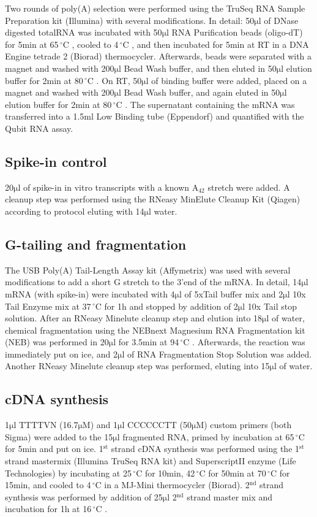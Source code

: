 \documentclass[10pt]{article}
\newcommand{\mul}{\ensuremath{\mathrm{\mu l}} }
\newcommand{\C}{\,$^{\circ}\mathrm{C}$ }
\begin{document}
Two rounds of poly(A) selection were performed using the TruSeq RNA Sample Preparation kit (Illumina) with several modifications. In detail: 50\mul of DNase digested totalRNA was incubated with 50\mul RNA Purification beads (oligo-dT) for 5min at 65\C, cooled to 4\C, and then incubated for 5min at RT in a DNA Engine tetrade 2 (Biorad) thermocycler. Afterwards, beads were separated with a magnet and washed with 200\mul Bead Wash buffer, and then eluted in 50\mul elution buffer for 2min at 80\C. On RT, 50\mul of binding buffer were added, placed on a magnet and washed with 200\mul Bead Wash buffer, and again eluted in 50\mul elution buffer for 2min at 80\C. The supernatant containing the mRNA was transferred into a 1.5ml Low Binding tube (Eppendorf) and quantified with the Qubit RNA assay.

\subsection*{Spike-in control}

20\mul of spike-in in vitro transcripts with a known A$_{42}$ stretch \cite{pelechano13} were added. A cleanup step was performed using the RNeasy MinElute Cleanup Kit (Qiagen) according to protocol eluting with 14\mul water.

\subsection*{G-tailing and fragmentation}

The USB Poly(A) Tail-Length Assay kit (Affymetrix) was used with several modifications to add a short G stretch to the 3’end of the mRNA. In detail, 14\mul mRNA (with spike-in) were incubated with 4\mul of 5xTail buffer mix and 2\mul 10x Tail Enzyme mix at 37\C for 1h and stopped by addition of 2\mul 10x Tail stop solution. After an RNeasy Minelute cleanup step and elution into 18\mul of water, chemical fragmentation using the NEBnext Magnesium RNA Fragmentation kit (NEB) was performed in 20\mul for 3.5min at 94\C. Afterwards, the reaction was immediately put on ice, and 2\mul of RNA Fragmentation Stop Solution was added. Another RNeasy Minelute cleanup step was performed, eluting into 15\mul of water.

\subsection*{cDNA synthesis}

1\mul TTTTVN (16.7$\mathrm{\mu M}$) and 1\mul CCCCCCTT (50$\mathrm{\mu M}$) custom primers (both Sigma) were added to the 15\mul fragmented RNA, primed by incubation at 65\C for 5min and put on ice. 1$^\mathrm{st}$ strand cDNA synthesis was performed using the 1$^\mathrm{st}$ strand mastermix (Illumina TruSeq RNA kit) and SuperscriptII enzyme (Life Technologies) by incubating at 25\C for 10min, 42\C for 50min at 70\C for 15min, and cooled to 4\C in a MJ-Mini thermocycler (Biorad). 2$^\mathrm{nd}$ strand synthesis was performed by addition of 25\mul 2$^\mathrm{nd}$ strand master mix and incubation for 1h at 16\C.
\end{document}
